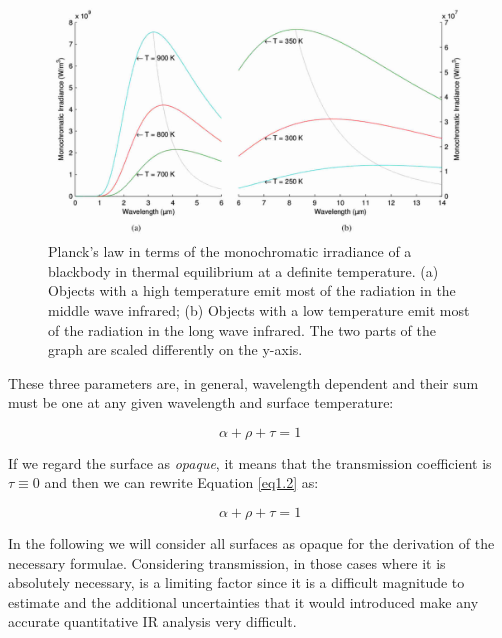 		\begin{figure}[ht!]
			\centering
			\captionsetup{justification=centering,margin=2cm}
			\includegraphics[scale=0.35]{Figures/Chapter01/PlankFunction.jpg}
			\caption{Planck’s law in terms of the  monochromatic irradiance of  a blackbody in thermal equilibrium at a definite temperature. (a) Objects with a high temperature emit most of the radiation in the middle wave infrared; (b) Objects with a low temperature emit most of the radiation in the long wave infrared. The two parts of the graph are scaled differently on the y-axis.}\label{fig1.3}
		\end{figure}		
		
		These three parameters are, in general, wavelength dependent and their sum must be one at any given wavelength and surface temperature:
		
		\begin{equation}\label{eq1.2}
			\alpha + \rho + \tau = 1
		\end{equation}\bigskip
		
		If we regard the surface as \textit{opaque}, it means that the transmission coefficient is $\tau \equiv 0$ and then we can rewrite Equation \ref{eq1.2} as:	
		
		\begin{equation}\label{eq1.3}
			\alpha + \rho + \tau = 1
		\end{equation}\bigskip
		
		In the following we will consider all surfaces as opaque for the derivation of the necessary formulae. Considering transmission, in those cases where it is absolutely necessary, is a limiting factor since it is a difficult magnitude to estimate and the additional uncertainties that it would introduced make any accurate quantitative IR analysis very difficult.
		\bigskip
		
